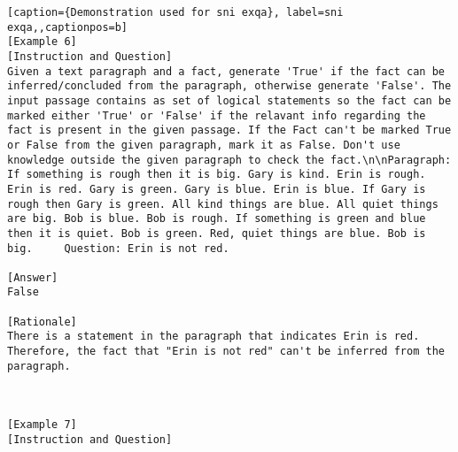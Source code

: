 \begin{lstlisting}[caption={Demonstration used for sni exqa}, label=sni exqa,,captionpos=b]
[Example 6]
[Instruction and Question]
Given a text paragraph and a fact, generate 'True' if the fact can be inferred/concluded from the paragraph, otherwise generate 'False'. The input passage contains as set of logical statements so the fact can be marked either 'True' or 'False' if the relavant info regarding the fact is present in the given passage. If the Fact can't be marked True or False from the given paragraph, mark it as False. Don't use knowledge outside the given paragraph to check the fact.\n\nParagraph: If something is rough then it is big. Gary is kind. Erin is rough. Erin is red. Gary is green. Gary is blue. Erin is blue. If Gary is rough then Gary is green. All kind things are blue. All quiet things are big. Bob is blue. Bob is rough. If something is green and blue then it is quiet. Bob is green. Red, quiet things are blue. Bob is big.     Question: Erin is not red.

[Answer]
False

[Rationale]
There is a statement in the paragraph that indicates Erin is red.  Therefore, the fact that "Erin is not red" can't be inferred from the paragraph.



[Example 7]
[Instruction and Question]

    \end{lstlisting}
    





